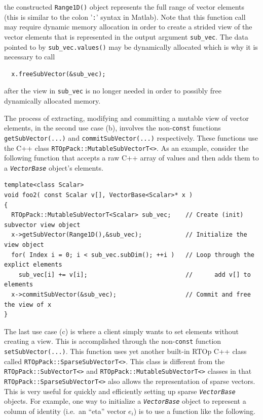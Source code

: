 \documentclass[pdf,ps2pdf,11pt]{SANDreport}
\begin{document}
{}\noindent{}the constructed {}\texttt{Range1D()} object represents
the full range of vector elements (this is similar to the colon
'\texttt{:}' syntax in Matlab).  Note that this function call may
require dynamic memory allocation in order to create a strided view of
the vector elements that is represented in the output argument
{}\texttt{sub\_vec}.  The data pointed to by
{}\texttt{sub\_vec.values()} may be dynamically allocated which is why
it is necessary to call

{\scriptsize\begin{verbatim}
  x.freeSubVector(&sub_vec);
\end{verbatim}}

{}\noindent{}after the view in {}\texttt{sub\_vec} is no longer needed
in order to possibly free dynamically allocated memory.

The process of extracting, modifying and committing a mutable view of
vector elements, in the second use case (b), involves the
non-\texttt{const} functions {}\texttt{getSubVector(...)} and
{}\texttt{commit\-Sub\-Vector(...)} respectively.  These functions use
the C++ class {}\texttt{RTOpPack::\-Mutable\-Sub\-VectorT<>}.  As an
example, consider the following function that accepts a raw C++ array
of values and then adds them to a {}\texttt{\textit{Vector\-Base}} object's
elements.

{\scriptsize\begin{verbatim}
template<class Scalar>
void foo2( const Scalar v[], VectorBase<Scalar>* x )
{
  RTOpPack::MutableSubVectorT<Scalar> sub_vec;    // Create (init) subvector view object
  x->getSubVector(Range1D(),&sub_vec);            // Initialize the view object
  for( Index i = 0; i < sub_vec.subDim(); ++i )   // Loop through the explict elements
    sub_vec[i] += v[i];                           //      add v[] to elements
  x->commitSubVector(&sub_vec);                   // Commit and free the view of x
}
\end{verbatim}}

The last use case (c) is where a client simply wants to set elements
without creating a view.  This is accomplished through the
non-\texttt{const} function {}\texttt{set\-Sub\-Vector(...)}.  This
function uses yet another built-in RTOp C++ class called
{}\texttt{RTOpPack::\-Sparse\-Sub\-VectorT<>}.  This class is
different from the {}\texttt{RTOpPack::\-SubVectorT<>} and
{}\texttt{RTOpPack::\-Mutable\-Sub\-VectorT<>} classes in that
{}\texttt{RTOpPack::\-Sparse\-Sub\-VectorT<>} also allows the
representation of sparse vectors.  This is very useful for quickly and
efficiently setting up sparse {}\texttt{\textit{Vector\-Base}} objects.  For
example, one way to initialize a {}\texttt{\textit{Vector\-Base}} object to
represent a column of identity (i.e.~an ``eta'' vector $e_i$) is to
use a function like the following.
\end{document}
